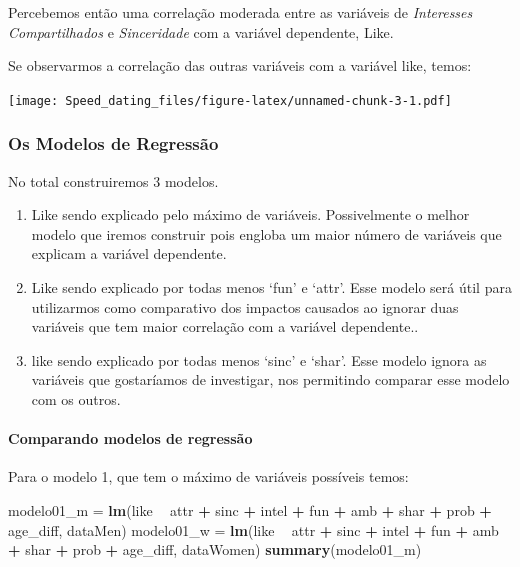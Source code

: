 \documentclass[]{article}
\newenvironment{Shaded}{\begin{snugshade}}{\end{snugshade}}
\newcommand{\KeywordTok}[1]{\textcolor[rgb]{0.13,0.29,0.53}{\textbf{#1}}}
\newcommand{\NormalTok}[1]{#1}
\newcommand{\OperatorTok}[1]{\textcolor[rgb]{0.81,0.36,0.00}{\textbf{#1}}}
\newcommand{\StringTok}[1]{\textcolor[rgb]{0.31,0.60,0.02}{#1}}
\let\oldparagraph\paragraph
\renewcommand{\paragraph}[1]{\oldparagraph{#1}\mbox{}}
\begin{document}
Percebemos então uma correlação moderada entre as variáveis de
\emph{Interesses Compartilhados} e \emph{Sinceridade} com a variável
dependente, Like.

Se observarmos a correlação das outras variáveis com a variável like,
temos:

\texttt{[image: Speed\_dating\_files/figure-latex/unnamed-chunk-3-1.pdf]}

\hypertarget{os-modelos-de-regressuxe3o}{%
\subsubsection{Os Modelos de
Regressão}\label{os-modelos-de-regressuxe3o}}

No total construiremos 3 modelos.

\begin{enumerate}
\def\labelenumi{\arabic{enumi}.}
\item
  Like sendo explicado pelo máximo de variáveis. Possivelmente o melhor
  modelo que iremos construir pois engloba um maior número de variáveis
  que explicam a variável dependente.
\item
  Like sendo explicado por todas menos `fun' e `attr'. Esse modelo será
  útil para utilizarmos como comparativo dos impactos causados ao
  ignorar duas variáveis que tem maior correlação com a variável
  dependente..
\item
  like sendo explicado por todas menos `sinc' e `shar'. Esse modelo
  ignora as variáveis que gostaríamos de investigar, nos permitindo
  comparar esse modelo com os outros.
\end{enumerate}

\hypertarget{comparando-modelos-de-regressuxe3o}{%
\paragraph{Comparando modelos de
regressão}\label{comparando-modelos-de-regressuxe3o}}

Para o modelo 1, que tem o máximo de variáveis possíveis temos:

\begin{Shaded}
\begin{Highlighting}[]
\NormalTok{modelo01_m =}\StringTok{ }\KeywordTok{lm}\NormalTok{(like }\OperatorTok{~}\StringTok{ }\NormalTok{attr }\OperatorTok{+}\StringTok{ }\NormalTok{sinc }\OperatorTok{+}\StringTok{ }\NormalTok{intel }\OperatorTok{+}\StringTok{ }\NormalTok{fun }\OperatorTok{+}\StringTok{ }\NormalTok{amb }\OperatorTok{+}\StringTok{ }\NormalTok{shar }\OperatorTok{+}\StringTok{  }\NormalTok{prob }\OperatorTok{+}\StringTok{ }\NormalTok{age_diff, dataMen)  }
\NormalTok{modelo01_w =}\StringTok{ }\KeywordTok{lm}\NormalTok{(like }\OperatorTok{~}\StringTok{ }\NormalTok{attr }\OperatorTok{+}\StringTok{ }\NormalTok{sinc }\OperatorTok{+}\StringTok{ }\NormalTok{intel }\OperatorTok{+}\StringTok{ }\NormalTok{fun }\OperatorTok{+}\StringTok{ }\NormalTok{amb }\OperatorTok{+}\StringTok{ }\NormalTok{shar }\OperatorTok{+}\StringTok{  }\NormalTok{prob }\OperatorTok{+}\StringTok{ }\NormalTok{age_diff, dataWomen)}
\KeywordTok{summary}\NormalTok{(modelo01_m)}
\end{Highlighting}
\end{Shaded}
\end{document}
